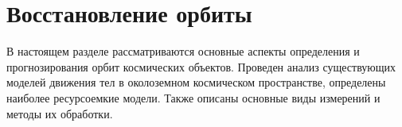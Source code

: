 \section{Восстановление орбиты}
В настоящем разделе рассматриваются основные аспекты определения и прогнозирования 
орбит космических объектов. Проведен анализ существующих моделей движения 
тел в околоземном космическом пространстве, определены наиболее ресурсоемкие модели.
Также описаны основные виды измерений и методы их обработки.
\label{sec:Chapter1} 









\newpage